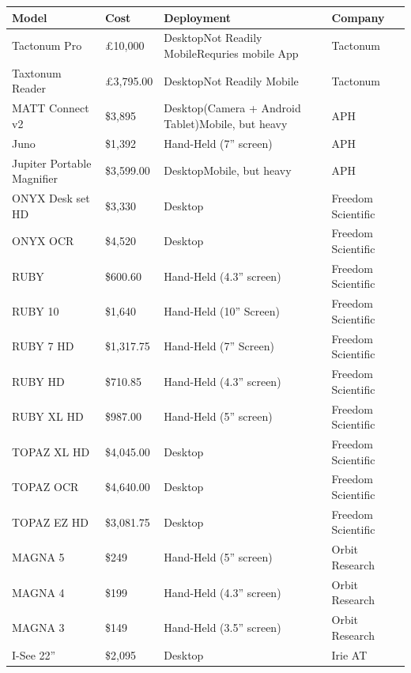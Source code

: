 \documentclass[14pt, letterpaper,twoside]{extreport}
\begin{document}
\begin{longtable}[]{@{}
 >{\raggedright\arraybackslash}p{}
 >{\raggedright\arraybackslash}p{}
 >{\raggedright\arraybackslash}p{}
 >{\raggedright\arraybackslash}p{}@{}
 }
\toprule\noalign{}

\textbf{Model}
&
\textbf{Cost}
&
\textbf{Deployment}
&
\textbf{Company}
\\
\midrule\noalign{}
\endhead
\bottomrule\noalign{}
\endlastfoot
Tactonum Pro & £10,000 & Desktop\break Not Readily Mobile\break Requries mobile App & Tactonum \\[1.0em]
Taxtonum Reader & £3,795.00 & Desktop\break Not Readily Mobile & Tactonum \\[1.0em]
MATT Connect v2 & \$3,895 & Desktop\break (Camera + Android Tablet)\break Mobile, but heavy & APH \\[1.0em]
Juno & \$1,392 & Hand-Held (7'' screen) & APH \\[1.0em]
Jupiter Portable Magnifier & \$3,599.00 & Desktop\break Mobile, but heavy & APH \\[1.0em]
ONYX Desk set HD & \$3,330 & Desktop & Freedom Scientific \\[1.0em]
ONYX OCR & \$4,520 & Desktop & Freedom Scientific \\[1.0em]
RUBY & \$600.60 & Hand-Held (4.3'' screen) & Freedom Scientific \\[1.0em]
RUBY 10 & \$1,640 & Hand-Held (10'' Screen) & Freedom Scientific \\[1.0em]
RUBY 7 HD & \$1,317.75 & Hand-Held (7'' Screen) & Freedom Scientific \\[1.0em]
RUBY HD & \$710.85 & Hand-Held (4.3'' screen) & Freedom Scientific \\[1.0em]
RUBY XL HD & \$987.00 & Hand-Held (5'' screen) & Freedom Scientific \\[1.0em]
TOPAZ XL HD & \$4,045.00 & Desktop & Freedom Scientific \\[1.0em]
TOPAZ OCR & \$4,640.00 & Desktop & Freedom Scientific \\[1.0em]
TOPAZ EZ HD & \$3,081.75 & Desktop & Freedom Scientific \\[1.0em]
MAGNA 5 & \$249 & Hand-Held (5'' screen) & Orbit Research \\[1.0em]
MAGNA 4 & \$199 & Hand-Held (4.3'' screen) & Orbit Research \\[1.0em]
MAGNA 3 & \$149 & Hand-Held (3.5'' screen) & Orbit Research \\[1.0em]
I-See 22'' & \$2,095 & Desktop & Irie AT \\[1.0em]

\end{longtable}
\end{document}
